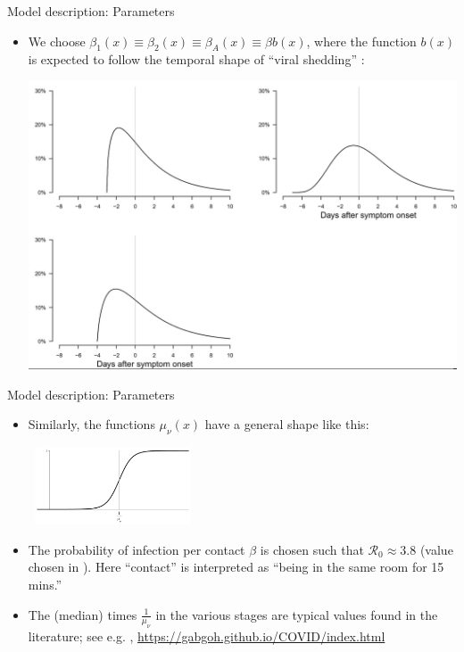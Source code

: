 \documentclass{beamer}
\begin{document}
  \begin{frame}{Model description: Parameters}
  \begin{itemize}
 \item We choose $\beta _1(x) \equiv  \beta _2(x) \equiv \beta _A(x) \equiv \beta b(x)$, where  
  the function $b(x) $ is expected to follow the temporal shape of ``viral shedding'' \cite{he2020temporal,ali2020serial,van2020shedding}:
 \begin{center}
 \includegraphics[scale=0.25]{infprofiles.png}  
 \end{center}
 \end{itemize} 
  \end{frame}
    \begin{frame}{Model description: Parameters}
  \begin{itemize}
  \item Similarly, the functions $\mu  _\nu (x)$ have a general shape like this: 
 \begin{center}
 \includegraphics[width=5cm,height=2.3cm]{mushape.png} 
 \end{center} 
 \item The probability of infection per contact  $\beta $ is chosen such that $\mathcal{R}_0
 \approx 3.8$ (value chosen in \cite{gressman2020simulating}).    Here ``contact'' is interpreted as ``being in the same
 room for 15 mins.'' 
 \item  The (median) times $\frac{1}{\mu _\nu}$ in the various stages are typical values found in the literature; see e.g. \cite{ferretti2020quantifying,Ferretti2020.03.08.20032946,ferguson2020report,russell2020using,prem2020wuhan}, \href{https://gabgoh.github.io/COVID/index.html}{https://gabgoh.github.io/COVID/index.html}
 
\end{itemize} 
  \end{frame}
  
\end{document}
